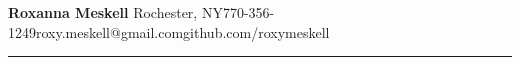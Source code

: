 \documentclass[10pt]{article} %
\newcommand{\makeheading}[2][]%
{\hspace*{-\marginparsep minus \marginparwidth}%
	\begin{minipage}[t]{\textwidth+\marginparwidth+\marginparsep}%
		{\LARGE \bfseries #2 \hfill #1}\\[-0.15\baselineskip]%
		\rule{\columnwidth}{1pt}%
	\end{minipage}}
\renewcommand{\section}[1]{\pagebreak[3]%
	\par %
	\phantomsection\addcontentsline{toc}{section}{#1}%
	\noindent\llap{\scshape\smash{\parbox[t]{\marginparwidth}{\hyphenpenalty=10000\raggedright #1}}}%
	\vspace{-\baselineskip}\par}
\begin{document}
	\hspace*{-\marginparsep minus \marginparwidth}%
	\begin{minipage}[t]{\textwidth+\marginparwidth+\marginparsep}%
		{\LARGE \bfseries Roxanna Meskell}%
		\hspace*{1em}Rochester, NY\hspace*{.5em}\textbar\hspace*{.5em}770-356-1249\hspace*{.5em}\textbar\hspace*{.5em}roxy.meskell@gmail.com\hspace*{.5em}\textbar\hspace*{.5em}github.com/roxymeskell
		\\[-0.5\baselineskip]
		\rule{\columnwidth}{1pt}%
	\end{minipage}
	\newlength{\rcollength}\setlength{\rcollength}{2in}%
	\newlength{\spacewidth}\setlength{\spacewidth}{20pt}%
	\newcommand\spacechar{$|$}%
%	
%		
%		
\end{document}
